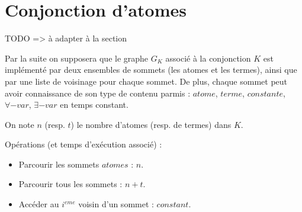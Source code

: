 
\section{Conjonction d'atomes}\label{def_graphe}
TODO => à adapter à la section

Par la suite on supposera que le graphe $G_{K}$ associé à la conjonction $K$ 
est impl\'ement\'e par deux ensembles de sommets (les atomes et les termes), 
ainsi que par une liste de voisinage pour chaque sommet.
De plus, chaque sommet peut avoir connaissance de son type de contenu parmis : 
$atome$, $terme$, $constante$, $\forall-var$, $\exists-var$
en temps constant.

On note $n$ (resp. $t$) le nombre d'atomes (resp. de termes) dans $K$. 

Op\'erations (et temps d'ex\'ecution associ\'e) :
\begin{itemize}
	\item Parcourir les sommets $atomes$ : $n$.
	\item Parcourir tous les sommets : $n + t$.
	\item Acc\'eder au $i^{eme}$ voisin d'un sommet : $constant$.
\end{itemize}


